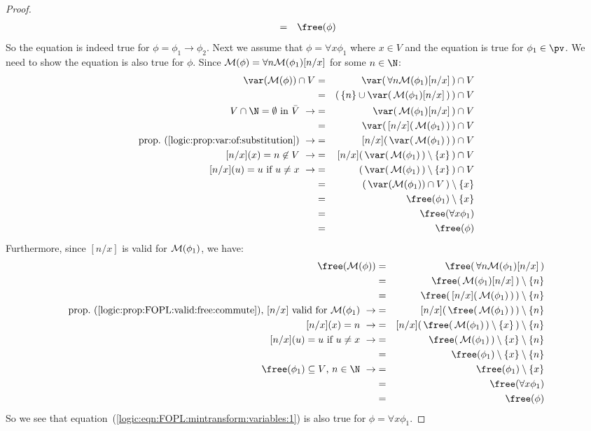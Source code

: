 \begin{proof}
\begin{eqnarray*}
    &=&\free(\phi)
    \end{eqnarray*}
So the equation is indeed true for $\phi=\phi_{1}\to\phi_{2}$. Next
we assume that $\phi=\forall x\phi_{1}$ where $x\in V$ and the
equation is true for $\phi_{1}\in\pv$. We need to show the equation
is also true for $\phi$. Since ${\cal M}(\phi)=\forall n{\cal
M}(\phi_{1})[n/x]$ for some $n\in\N$:
    \begin{eqnarray*}
    \var({\cal M}(\phi))\cap V&=&\var(\,\forall n{\cal
    M}(\phi_{1})[n/x]\,)\cap V\\
    &=&(\,\{n\}\cup\var(\,{\cal M}(\phi_{1})[n/x]\,)\,)\cap V\\
    \mbox{$V\cap\N=\emptyset$ in $\bar{V}$}\ \rightarrow
    &=&\var(\,{\cal M}(\phi_{1})[n/x]\,)\cap V\\
    &=&\var(\,[n/x](\,{\cal M}(\phi_{1})\,)\,)\cap V\\
    \mbox{prop.~(\ref{logic:prop:var:of:substitution})}\ \rightarrow
    &=&[n/x](\,\var(\,{\cal M}(\phi_{1})\,)\,)\cap V\\
    \mbox{$[n/x](x)=n\not\in V$}\ \rightarrow
    &=&[n/x](\,\var(\,{\cal M}(\phi_{1})\,)\setminus\{x\}\,)\cap V\\
    \mbox{$[n/x](u)=u$ if $u\neq x$}\ \rightarrow
    &=&(\,\var(\,{\cal M}(\phi_{1})\,)\setminus\{x\}\,)\cap V\\
    &=&(\,\var({\cal M}(\phi_{1}))\cap V\,)\setminus\{x\}\\
    &=&\free(\phi_{1})\setminus\{x\}\\
    &=&\free(\forall x\phi_{1})\\
    &=&\free(\phi)
    \end{eqnarray*}
Furthermore, since $[n/x]$ is valid for ${\cal M}(\phi_{1})$, we
have:
    \begin{eqnarray*}
    \free({\cal M}(\phi))&=&\free(\,\forall n{\cal
    M}(\phi_{1})[n/x]\,)\\
    &=&\free(\,{\cal
    M}(\phi_{1})[n/x]\,)\setminus\{n\}\\
    &=&\free(\,[n/x](\,{\cal M}(\phi_{1})\,)\,)\setminus\{n\}\\
    \mbox{prop.~(\ref{logic:prop:FOPL:valid:free:commute}),
    $[n/x]$ valid for ${\cal M}(\phi_{1})$}\ \rightarrow
    &=&[n/x](\,\free(\,{\cal M}(\phi_{1})\,)\,)\setminus\{n\}\\
    \mbox{$[n/x](x)=n$}\ \rightarrow
    &=&[n/x](\,\free(\,{\cal
    M}(\phi_{1})\,)\setminus\{x\}\,)\setminus\{n\}\\
    \mbox{$[n/x](u)=u$ if $u\neq x$}\ \rightarrow
    &=&\free(\,{\cal
    M}(\phi_{1})\,)\setminus\{x\}\setminus\{n\}\\
    &=&\free(\phi_{1})\setminus\{x\}\setminus\{n\}\\
    \mbox{$\free(\phi_{1})\subseteq V$, $n\in\N$}\ \rightarrow
    &=&\free(\phi_{1})\setminus\{x\}\\
    &=&\free(\forall x\phi_{1})\\
    &=&\free(\phi)
    \end{eqnarray*}
So we see that
equation~(\ref{logic:eqn:FOPL:mintransform:variables:1}) is also
true for $\phi=\forall x\phi_{1}$.
\end{proof}

